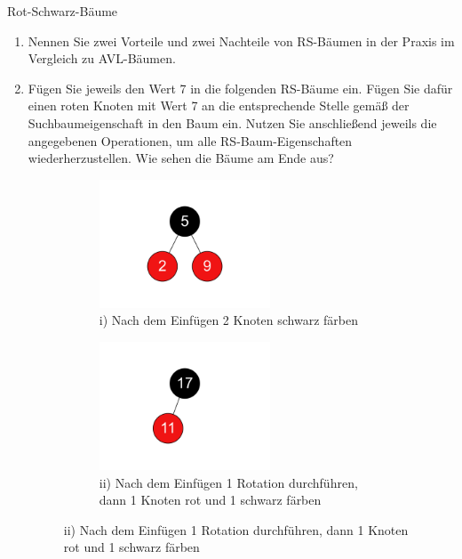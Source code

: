 \documentclass[11pt,a4paper]{article}
\begin{document}
\begin{aufgabe}{2}{Rot-Schwarz-Bäume}
    \begin{enumerate}
        \item
        Nennen Sie zwei Vorteile und zwei Nachteile von RS-Bäumen in der Praxis im Vergleich zu AVL-Bäumen.

        \item \hard Fügen Sie jeweils den Wert 7 in die folgenden RS-Bäume ein.
        Fügen Sie dafür einen roten Knoten mit Wert 7 an die entsprechende Stelle gemäß der Suchbaumeigenschaft in den Baum ein.
        Nutzen Sie anschließend jeweils die angegebenen Operationen, um alle RS-Baum-Eigenschaften wiederherzustellen.
        Wie sehen die Bäume am Ende aus?

        \begin{figure}[h!]
            \centering
            \begin{subfigure}[t]{0.28\textwidth}
                \centering
                \includegraphics[width=0.6\textwidth]{img/2a_1}
                \caption*{i) Nach dem Einfügen 2 Knoten schwarz färben}
            \end{subfigure}
            \begin{subfigure}[t]{0.28\textwidth}
                \centering
                \includegraphics[width=0.6\textwidth]{img/2a_2}
                \caption*{ii) Nach dem Einfügen 1 Rotation durchführen, dann 1 Knoten rot und 1 schwarz färben}

\end{subfigure}
\end{figure}
\end{enumerate}
\end{aufgabe}
\end{document}
